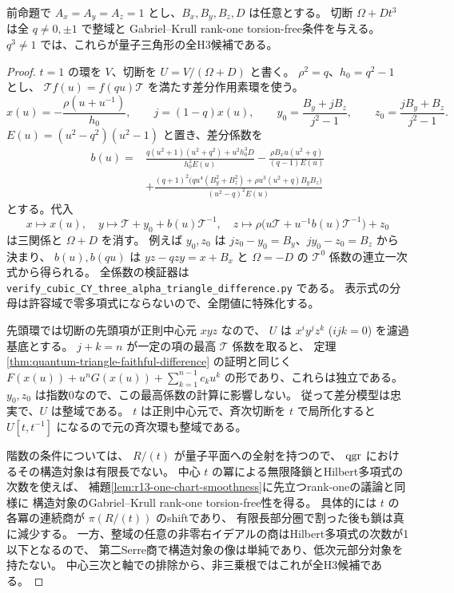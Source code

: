 \begin{theorem}\label{thm:cubic-CY-three-alpha-quantum-triangle-constants-domain}
前命題で $A_x=A_y=A_z=1$ とし、$B_x,B_y,B_z,D$ は任意とする。
切断 $\Omega+Dt^3$ は全 $q\ne0,\pm1$ で整域と
Gabriel--Krull rank-one torsion-free条件を与える。
$q^3\ne1$ では、これらが量子三角形の全H3候補である。
\end{theorem}
\begin{proof}
$t=1$ の環を $V$、切断を $U=V/(\Omega+D)$ と書く。
$\rho^2=q$、$h_0=q^2-1$ とし、
$\mathcal T f(u)=f(qu)\mathcal T$ を満たす差分作用素環を使う。
\[
 x(u)=-\frac{\rho(u+u^{-1})}{h_0},\qquad j=(1-q)x(u),\qquad
 y_0=\frac{B_y+jB_z}{j^2-1},\qquad
 z_0=\frac{jB_y+B_z}{j^2-1}.
\]
$E(u)=(u^2-q^2)(u^2-1)$ と置き、差分係数を
\begin{align*}
 b(u)={}&\frac{q(u^2+1)(u^2+q^2)+u^2h_0^3D}{h_0^2E(u)}
 -\frac{\rho B_xu(u^2+q)}{(q-1)E(u)}\\
 &+\frac{(q+1)^2\bigl(q u^4(B_y^2+B_z^2)+\rho u^3(u^2+q)B_yB_z\bigr)}
 {(u^2-q)^2E(u)}
\end{align*}
とする。代入
\[
 x\longmapsto x(u),\quad
 y\longmapsto\mathcal T+y_0+b(u)\mathcal T^{-1},\quad
 z\longmapsto\rho\bigl(u\mathcal T+u^{-1}b(u)\mathcal T^{-1}\bigr)+z_0
\]
は三関係と $\Omega+D$ を消す。
例えば $y_0,z_0$ は $jz_0-y_0=B_y$、$jy_0-z_0=B_z$ から決まり、
$b(u),b(qu)$ は $yz-qzy=x+B_x$ と $\Omega=-D$ の $\mathcal T^0$ 係数の連立一次式から得られる。
全係数の検証器は
\texttt{verify\_cubic\_CY\_three\_alpha\_triangle\_difference.py} である。
表示式の分母は許容域で零多項式にならないので、全閉値に特殊化する。

先頭環では切断の先頭項が正則中心元 $xyz$ なので、
$U$ は $x^iy^jz^k$ ($ijk=0$) を濾過基底とする。
$j+k=n$ が一定の項の最高 $\mathcal T$ 係数を取ると、
定理\ref{thm:quantum-triangle-faithful-difference} の証明と同じく
$F(x(u))+u^n G(x(u))+\sum_{k=1}^{n-1}c_k u^k$ の形であり、これらは独立である。
$y_0,z_0$ は指数0なので、この最高係数の計算に影響しない。
従って差分模型は忠実で、$U$ は整域である。
$t$ は正則中心元で、斉次切断を $t$ で局所化すると $U[t,t^{-1}]$ になるので元の斉次環も整域である。

階数の条件については、
$R/(t)$ が量子平面への全射を持つので、
$\operatorname{qgr}$ におけるその構造対象は有限長でない。
中心 $t$ の冪による無限降鎖とHilbert多項式の次数を使えば、
補題\ref{lem:r13-one-chart-smoothness}に先立つrank-oneの議論と同様に
構造対象のGabriel--Krull rank-one torsion-free性を得る。
具体的には $t$ の各冪の連続商が $\pi(R/(t))$ のshiftであり、
有限長部分圏で割った後も鎖は真に減少する。
一方、整域の任意の非零右イデアルの商はHilbert多項式の次数が1以下となるので、
第二Serre商で構造対象の像は単純であり、低次元部分対象を持たない。
中心三次と軸での排除から、非三乗根ではこれが全H3候補である。
\end{proof}

